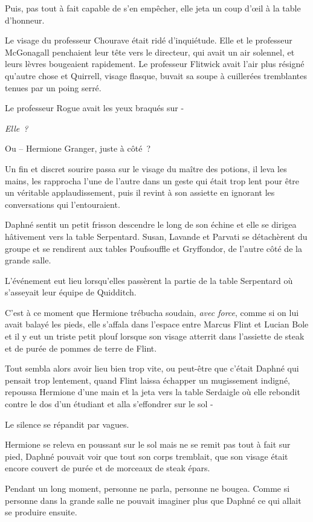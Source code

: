 Puis, pas tout à fait capable de s'en empêcher, elle jeta un coup d'œil à la table d'honneur.

Le visage du professeur Chourave était ridé d'inquiétude. Elle et le professeur McGonagall penchaient leur tête vers le directeur, qui avait un air solennel, et leurs lèvres bougeaient rapidement. Le professeur Flitwick avait l'air plus résigné qu'autre chose et Quirrell, visage flasque, buvait sa soupe à cuillerées tremblantes tenues par un poing serré.

Le professeur Rogue avait les yeux braqués sur -

\emph{Elle~?}

Ou -- Hermione Granger, juste à côté~?

Un fin et discret sourire passa sur le visage du maître des potions, il leva les mains, les rapprocha l'une de l'autre dans un geste qui était trop lent pour être un véritable applaudissement, puis il revint à son assiette en ignorant les conversations qui l'entouraient.

Daphné sentit un petit frisson descendre le long de son échine et elle se dirigea hâtivement vers la table Serpentard. Susan, Lavande et Parvati se détachèrent du groupe et se rendirent aux tables Poufsouffle et Gryffondor, de l'autre côté de la grande salle.

L'événement eut lieu lorsqu'elles passèrent la partie de la table Serpentard où s'asseyait leur équipe de Quidditch.

C'est à ce moment que Hermione trébucha soudain, \emph{avec force}, comme si on lui avait balayé les pieds, elle s'affala dans l'espace entre Marcus Flint et Lucian Bole et il y eut un triste petit plouf lorsque son visage atterrit dans l'assiette de steak et de purée de pommes de terre de Flint.

Tout sembla alors avoir lieu bien trop vite, ou peut-être que c'était Daphné qui pensait trop lentement, quand Flint laissa échapper un mugissement indigné, repoussa Hermione d'une main et la jeta vers la table Serdaigle où elle rebondit contre le dos d'un étudiant et alla s'effondrer sur le sol -

Le silence se répandit par vagues.

Hermione se releva en poussant sur le sol mais ne se remit pas tout à fait sur pied, Daphné pouvait voir que tout son corps tremblait, que son visage était encore couvert de purée et de morceaux de steak épars.

Pendant un long moment, personne ne parla, personne ne bougea. Comme si personne dans la grande salle ne pouvait imaginer plus que Daphné ce qui allait se produire ensuite.

